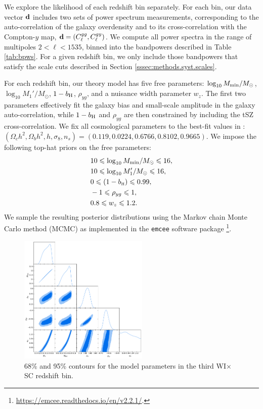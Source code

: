 \documentclass[useAMS,usenatbib]{mn2e}
\def\bH{b_{\scriptscriptstyle\rm H}}
\begin{document}
    We explore the likelihood of each redshift bin separately. For each bin, our data vector ${\bf d}$ includes two sets of power spectrum measurements, corresponding to the auto-correlation of the galaxy overdensity and to its cross-correlation with the Compton-$y$ map, ${\bf d}=(C^{gg}_\ell,C^{gy}_\ell)$. We compute all power spectra in the range of multipoles $2<\ell<1535$, binned into the bandpowers described in Table \ref{tab:bpws}. For a given redshift bin, we only include those bandpowers that satisfy the scale cuts described in Section \ref{sssec:methods.syst.scales}.

    For each redshift bin, our theory model has five free parameters: $\log_{10}M_{\rm min}/M_\odot$, $\log_{10}M_1'/M_\odot$, $1-b_{\rm H}$, $\rho_{yg}$, and a nuisance width parameter $w_z$. The first two parameters effectively fit the galaxy bias and small-scale amplitude in the galaxy auto-correlation, while $1-b_{\rm H}$ and $\rho_{yg}$ are then constrained by including the tSZ cross-correlation. We fix all cosmological parameters to the best-fit values in \cite{2018arXiv180706209P}: $(\Omega_c h^2,\Omega_bh^2,h,\sigma_8,n_s)=(0.119,0.0224,0.6766,0.8102,0.9665)$. We impose the following top-hat priors on the free parameters:
    \begin{align}
      &10\le\log_{10}M_{\rm min}/M_\odot\le16,\\
      &10\le\log_{10}M_1'/M_\odot\le16,\\
      &0\le(1-\bH)\le0.99,\\
      &-1\le\rho_{yg}\le1,\\
      &0.8\le w_z\le1.2.
    \end{align}
    We sample the resulting posterior distributions using the Markov chain Monte Carlo method (MCMC) as implemented in the {\tt emcee} software package \citep{2013PASP..125..306F}\footnote{\url{https://emcee.readthedocs.io/en/v2.2.1/}.}.


      \begin{figure}
        \centering
        \includegraphics[width=0.55\textwidth]{fiducial_wisc3.pdf}
        \caption{68\% and 95\% contours for the model parameters in the third WI$\times$SC redshift bin.}
        \label{fig:triangle}
      \end{figure}
\end{document}
